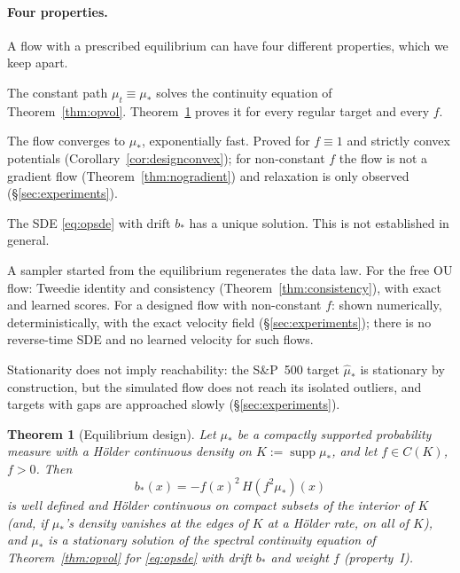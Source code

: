 \documentclass[11pt]{article}
\DeclareMathOperator{\supp}{supp}
\theoremstyle{plain}
\newtheorem{theorem}{Theorem}[section]
\theoremstyle{definition}
\theoremstyle{remark}
\begin{document}
\paragraph{Four properties.} A flow with a prescribed equilibrium can have four different properties,
which we keep apart.
\begin{description}[leftmargin=0pt,itemsep=1pt,topsep=2pt,parsep=0pt,font=\normalfont\bfseries]
\item[(I) Stationarity.] The constant path $\mu_t\equiv\mu_*$ solves the continuity equation of
Theorem~\ref{thm:opvol}. Theorem~\ref{thm:design} proves it for every regular target and every $f$.
\item[(II) Relaxation.] The flow converges to $\mu_*$, exponentially fast. Proved for $f\equiv1$ and strictly convex
potentials (Corollary~\ref{cor:designconvex}); for non-constant $f$ the flow is not a gradient flow
(Theorem~\ref{thm:nogradient}) and relaxation is only observed (\S\ref{sec:experiments}).
\item[(III) Well-posedness.] The SDE \eqref{eq:opsde} with drift $b_*$ has a unique solution. This is not
established in general.
\item[(IV) Reverse-time generation.] A sampler started from the equilibrium regenerates the data law. For
the free OU flow: Tweedie identity and consistency (Theorem~\ref{thm:consistency}), with exact and learned scores.
For a designed flow with non-constant $f$: shown numerically, deterministically, with the exact velocity field
(\S\ref{sec:experiments}); there is no reverse-time SDE and no learned velocity for such flows.
\end{description}
Stationarity does not imply reachability: the S\&P~500 target $\hat\mu_*$ is stationary by construction,
but the simulated flow does not reach its isolated outliers, and targets with gaps are approached slowly
(\S\ref{sec:experiments}).

\begin{theorem}[Equilibrium design]\label{thm:design}
Let $\mu_*$ be a compactly supported probability measure with a H\"older continuous
density on $K:=\supp\mu_*$, and let $f\in C(K)$, $f>0$. Then
\begin{equation}\label{eq:designdrift}
  b_*(x) = -f(x)^2\,H(f^2\mu_*)(x)
\end{equation}
is well defined and H\"older continuous on compact subsets of the interior of $K$
(and, if $\mu_*$'s density vanishes at the edges of $K$ at a H\"older rate, on all of
$K$), and $\mu_*$ is a stationary solution of the spectral continuity equation of
Theorem~\ref{thm:opvol} for \eqref{eq:opsde} with drift $b_*$ and weight $f$
(property~I).
\end{theorem}
\end{document}
